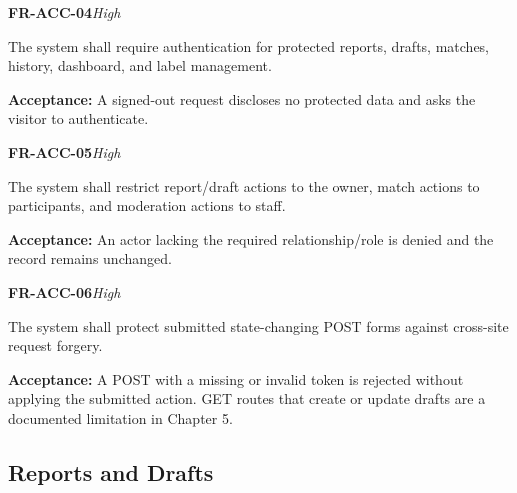 \documentclass[12pt,a4paper,oneside]{report}
\begin{document}
\noindent\begin{minipage}{\linewidth}\textbf{FR-ACC-04}\hfill\textit{High}\par\nopagebreak

The system shall require authentication for protected reports, drafts, matches, history, dashboard, and label management.

{\color{muted}\textbf{Acceptance:} A signed-out request discloses no protected data and asks the visitor to authenticate.\par}\end{minipage}\par\vspace{5pt}

\noindent\begin{minipage}{\linewidth}\textbf{FR-ACC-05}\hfill\textit{High}\par\nopagebreak

The system shall restrict report/draft actions to the owner, match actions to participants, and moderation actions to staff.

{\color{muted}\textbf{Acceptance:} An actor lacking the required relationship/role is denied and the record remains unchanged.\par}\end{minipage}\par\vspace{5pt}

\noindent\begin{minipage}{\linewidth}\textbf{FR-ACC-06}\hfill\textit{High}\par\nopagebreak

The system shall protect submitted state-changing POST forms against cross-site request forgery.

{\color{muted}\textbf{Acceptance:} A POST with a missing or invalid token is rejected without applying the submitted action. GET routes that create or update drafts are a documented limitation in Chapter 5.\par}\end{minipage}\par\vspace{5pt}


\subsection{Reports and Drafts}
\end{document}
